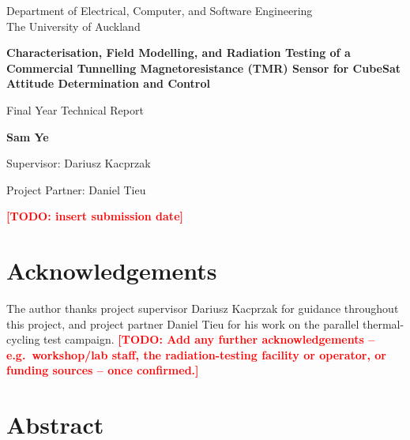 \documentclass[12pt,a4paper]{article}
\newcommand{\todo}[1]{\textcolor{red}{\textbf{[TODO: #1]}}}
\begin{document}
\begin{titlepage}
\centering
\vspace*{1.5cm}
{\large Department of Electrical, Computer, and Software Engineering \\ The University of Auckland \par}
\vspace{2.5cm}
{\Huge\bfseries Characterisation, Field Modelling, and Radiation Testing of a Commercial Tunnelling Magnetoresistance (TMR) Sensor for CubeSat Attitude Determination and Control \par}
\vspace{2cm}
{\Large Final Year Technical Report \par}
\vspace{2.5cm}
{\large\bfseries Sam Ye \par}
\vspace{0.6cm}
{\large Supervisor: Dariusz Kacprzak \par}
\vspace{0.2cm}
{\large Project Partner: Daniel Tieu \par}
\vfill
{\large \todo{insert submission date} \par}
\end{titlepage}


\clearpage
\section*{Acknowledgements}

The author thanks project supervisor Dariusz Kacprzak for guidance throughout this project, and project partner Daniel Tieu for his work on the parallel thermal-cycling test campaign. \todo{Add any further acknowledgements -- e.g.\ workshop/lab staff, the radiation-testing facility or operator, or funding sources -- once confirmed.}



\clearpage

\setcounter{page}{2}
\section*{Abstract}
\end{document}
